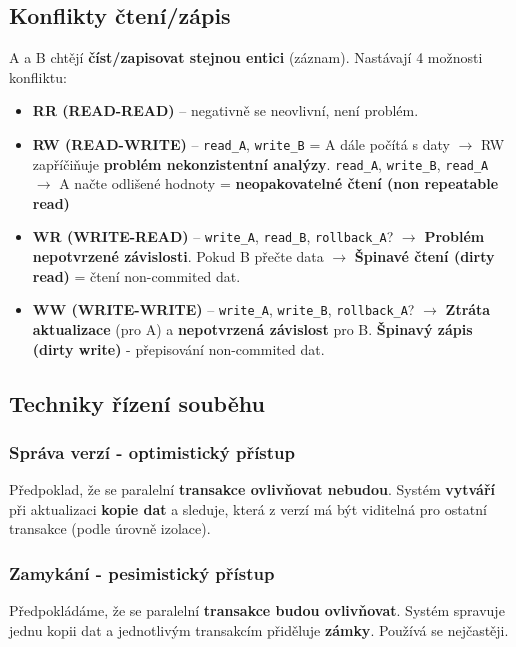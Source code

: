 \subsection{Konflikty čtení/zápis}
A a B chtějí \textbf{číst/zapisovat stejnou entici} (záznam). Nastávají 4 možnosti konfliktu:
\begin{itemize}
\item \textbf{RR (READ-READ)} -- negativně se neovlivní, není problém.
\item \textbf{RW (READ-WRITE)} -- \texttt{read\_A}, \texttt{write\_B} = A dále počítá s daty $\rightarrow$ RW zapříčiňuje \textbf{problém nekonzistentní analýzy}. \texttt{read\_A}, \texttt{write\_B}, \texttt{read\_A} $\rightarrow$ A načte odlišené hodnoty = \textbf{neopakovatelné čtení (non repeatable read)}
\item \textbf{WR (WRITE-READ)} -- \texttt{write\_A}, \texttt{read\_B}, \texttt{rollback\_A}? $\rightarrow$ \textbf{Problém nepotvrzené závislosti}. Pokud B přečte data $\rightarrow$ \textbf{Špinavé čtení (dirty read)} = čtení non-commited dat.
\item \textbf{WW (WRITE-WRITE)} -- \texttt{write\_A}, \texttt{write\_B}, \texttt{rollback\_A}? $\rightarrow$ \textbf{Ztráta aktualizace} (pro A) a \textbf{nepotvrzená závislost} pro B. \textbf{Špinavý zápis}\textbf{ (dirty write)} - přepisování non-commited dat.
\end{itemize}

\subsection{Techniky řízení souběhu}
\subsubsection{Správa verzí - optimistický přístup}
Předpoklad, že se paralelní \textbf{transakce ovlivňovat nebudou}. Systém \textbf{vytváří} při aktualizaci\textbf{ kopie dat }a sleduje, která z verzí má být viditelná pro ostatní transakce (podle úrovně izolace).

\subsubsection{Zamykání - pesimistický přístup}
Předpokládáme, že se paralelní \textbf{transakce budou ovlivňovat}. Systém spravuje jednu kopii dat a jednotlivým transakcím přiděluje \textbf{zámky}. Používá se nejčastěji.

